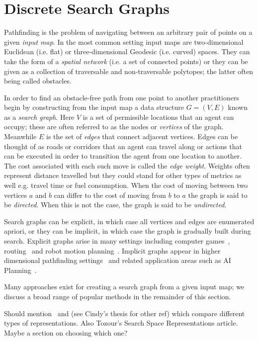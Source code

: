 \section{Discrete Search Graphs}
\label{cha::lit::graphs}
Pathfinding is the problem of navigating between an arbitrary pair of points on
a given \emph{input map}.  In the most common setting input maps are
two-dimensional Euclidean (i.e. flat) or three-dimensional Geodesic (i.e. curved) 
spaces. They can take the form of a \emph{spatial network} (i.e. a set of
connected points) or they can be given as a collection of traversable and
non-traversable polytopes; the latter often being called obstacles.

In order to find an obstacle-free path from one point to another practitioners
begin by constructing from the input map a data structure $G = (V, E)$
known as a \emph{search graph}.  Here $V$ is a set of permissible locations that
an agent can occupy; these are often referred to as the nodes or \emph{vertices}
of the graph.  Meanwhile $E$ is the set of \emph{edges} that connect adjacent
vertices.  Edges can be thought of as roads or corridors that an agent can
travel along or actions that can be executed in order to transition the agent
from one location to another.
The cost associated with each such move is called the \emph{edge weight}.
Weights often represent distance travelled but they could stand for other types
of metrics as well e.g. travel time or fuel consumption.  When the cost of
moving between two vertices $a$ and $b$ can differ to the cost of moving from $b$ to
$a$ the graph is said to be \emph{directed}.  When this is not the case, the
graph is said to be \emph{undirected}.  

Search graphs can be explicit, in which case all vertices and edges are
enumerated apriori, or they can be implicit, in which case the graph is
gradually built during search. Explicit graphs arise in many settings including
computer games~\citep{davis00,tozour02,champandard09}, 
routing~\citep{sanders05,goldberg06} and robot motion
planning~\citep{latombe91,choset05}.  Implicit graphs appear in higher
dimensional pathfinding settings~\citep{lavalle98,bohlin00} and related
application areas such as AI Planning~\citep{russel03}.  

Many approaches exist for creating a search graph from a given input map; we
discuss a broad range of popular methods in the remainder of this section.

Should mention~\citep{yap02} and (see Cindy's thesis for other ref) which 
compare different types of representations. Also Tozour's Search Space Representations
article.
Maybe a section on choosing which one?

